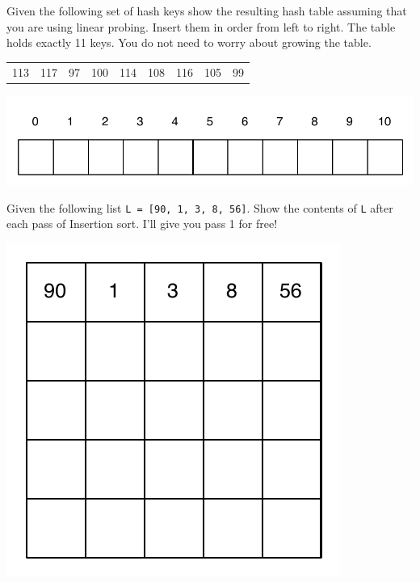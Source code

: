 \documentclass[11pt]{exam}
\begin{document}
\begin{questions}

\newpage
\question[10] Given the following set of hash keys show the resulting hash table assuming that you are using linear probing.  Insert them in order from left to right.  The table holds exactly 11 keys.  You do not need to worry about growing the table.

\begin{table}[h!]
    \begin{center}
    \begin{tabular}{|c|c|c|c|c|c|c|c|c|}
    113 & 117 & 97 & 100 & 114 & 108 & 116 & 105 & 99 \\
     \end{tabular}
     \includegraphics{hash_table_11}
    \end{center}
    \label{htab}
\end{table}


\question[10] Given the following list \lstinline{L = [90, 1, 3, 8, 56]}.  Show the contents of \lstinline{L} after each pass of Insertion sort.  I'll give you pass 1 for free!
\begin{center}
\includegraphics{insertion_boxes}
\end{center}


\end{questions}
\end{document}
